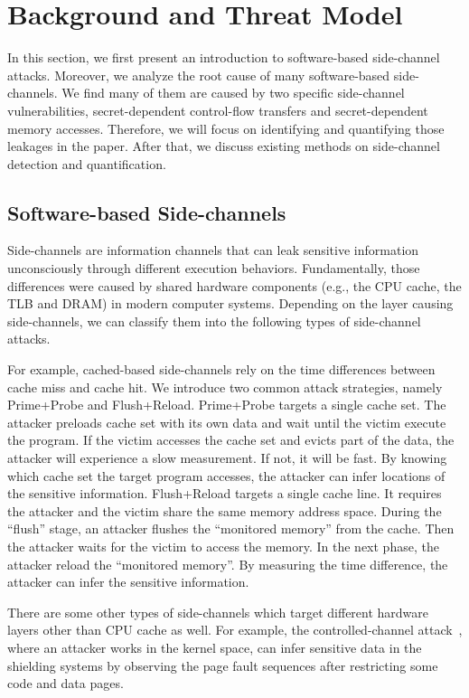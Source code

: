 \section{Background and Threat Model}
In this section, we first present an introduction to software-based 
side-channel attacks. Moreover, we analyze the root cause of many
software-based side-channels. We find many of them are caused by
two specific side-channel vulnerabilities, secret-dependent control-flow transfers and
secret-dependent memory accesses. Therefore, we will focus on identifying
and quantifying those leakages in the paper. After that, we 
discuss existing methods on side-channel detection and quantification.

\subsection{Software-based Side-channels}
Side-channels are information channels that can leak sensitive information 
unconsciously through different execution behaviors.  Fundamentally, those 
differences were caused by shared hardware
components (e.g., the CPU cache, the TLB and DRAM) in modern computer systems.
Depending on the layer causing side-channels, we can classify them 
into the following types of side-channel attacks.

For example, cached-based side-channels rely on the time differences 
between cache miss and cache hit. We introduce two common attack strategies,
namely Prime+Probe and Flush+Reload.
Prime+Probe targets a single cache set. The attacker preloads cache set with
its own data and wait until the victim execute the program.
If the victim accesses the cache set and evicts part of 
the data, the attacker will experience a slow measurement. If not, 
it will be fast. By knowing which cache set the target
program accesses, the attacker can infer locations of
the sensitive information. Flush+Reload targets a single cache line. 
It requires the attacker and the victim share the same memory address space.
During the ``flush'' stage, an attacker 
flushes the ``monitored memory'' from the cache. Then the attacker
waits for the victim to access the memory. In the next phase, the 
attacker reload the ``monitored memory''. By measuring the time difference, the
attacker can infer the sensitive information.

There are some other types of side-channels which target different hardware layers other than  
CPU cache as well.
For example, the controlled-channel attack~\cite{7163052},
where an attacker works in the kernel space, can infer sensitive data in the shielding systems by
observing the page fault sequences after restricting some code and
data pages. 

